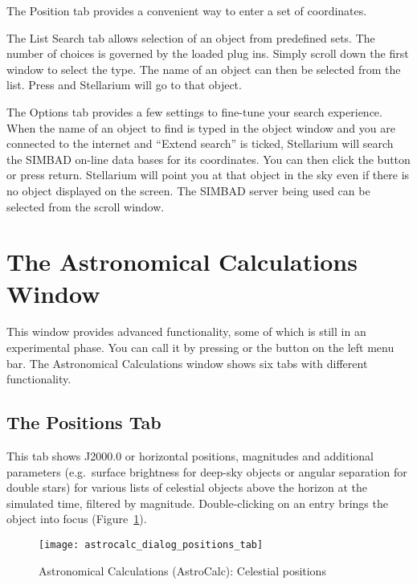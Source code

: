 The Position tab provides a convenient way to enter a set
of coordinates.

The List Search tab allows selection of an object from predefined
sets.  The number of choices is governed by the loaded plug
ins. Simply scroll down the first window to select the type. The name
of an object can then be selected from the list. Press \key{\return} and
Stellarium will go to that object.

The Options tab provides a few settings to fine-tune your search experience.
When the name of an object to find is typed in the object
window and you are connected to the internet and ``Extend search'' is
ticked, Stellarium will search the SIMBAD on-line  data bases for its
coordinates. You can then click the  button or press return.
Stellarium will point you at that object in the sky even if there is no
object displayed on the screen. The SIMBAD server being used can be
selected from the scroll window.


\section{The Astronomical Calculations Window}
\label{sec:gui:AstroCalc}

 This window provides advanced functionality, some of which is still in an experimental phase. 
You can call it by pressing  or the button  on the left menu bar. 
The Astronomical Calculations window shows six tabs with different functionality.

\subsection{The Positions Tab}
\label{sec:gui:AstroCalc:Positions}

 This tab shows J2000.0 or horizontal positions, magnitudes and additional parameters 
(e.g.\ surface brightness for deep-sky objects or angular separation for double stars) for various 
lists of celestial objects above the horizon at the simulated time, filtered by magnitude. 
Double-clicking on an entry brings the object into focus (Figure~\ref{fig:gui:AstroCalc:Positions}).


\begin{figure}[htbp]
\centering\texttt{[image: astrocalc\_dialog\_positions\_tab]}
\caption{Astronomical Calculations (AstroCalc): Celestial positions}
\label{fig:gui:AstroCalc:Positions}
\end{figure}

